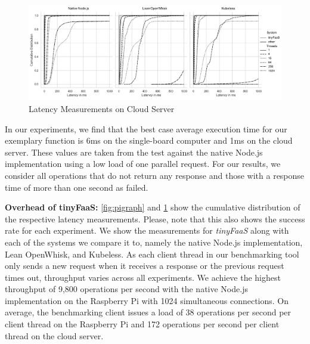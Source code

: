 \begin{figure}[ht]
    \centering
    \includegraphics[width=1\columnwidth]{fig/awsgraph.pdf}
    \caption{Latency Measurements on Cloud Server}
    \label{fig:awsgraph}
\end{figure}

In our experiments, we find that the best case average execution time for our exemplary function is 6ms on the single-board computer and 1ms on the cloud server.
These values are taken from the test against the native Node.js implementation using a low load of one parallel request.
For our results, we consider all operations that do not return any response and those with a response time of more than one second as failed.

\textbf{Overhead of tinyFaaS:} \cref{fig:pigraph} and \cref{fig:awsgraph} show the cumulative distribution of the respective latency measurements.
Please, note that this also shows the success rate for each experiment.
We show the measurements for \textit{tinyFaaS} along with each of the systems we compare it to, namely the native Node.js implementation, Lean OpenWhisk, and Kubeless.
As each client thread in our benchmarking tool only sends a new request when it receives a response or the previous request times out, throughput varies across all experiments.
We achieve the highest throughput of 9,800 operations per second with the native Node.js implementation on the Raspberry Pi with 1024 simultaneous connections.
On average, the benchmarking client issues a load of 38 operations per second per client thread on the Raspberry Pi and 172 operations per second per client thread on the cloud server.

